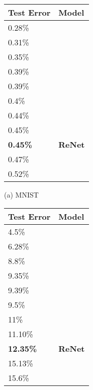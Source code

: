 \documentclass{article} \usepackage{nips15submit_e,times}
\begin{document}
\begin{table}[ht]
    \centering

    \begin{minipage}{0.45\textwidth}
        \centering

        \begin{tabular}{l |  l}
            Test Error & Model  \\
            \hline
0.28\% & \citep{DBLP:conf/icml/WanZZLF13} \\
0.31\% & \citep{DBLP:journals/corr/Graham14} \\ 
0.35\% & \citep{DBLP:journals/corr/abs-1003-0358} \\
0.39\% & \citep{DBLP:conf/nips/MairalKHS14} \\
0.39\% & \citep{DBLP:journals/corr/LeeXGZT14} \\
0.4\% & \citep{DBLP:conf/icdar/SimardSP03} \\
0.44\% & \citep{DBLP:journals/corr/Graham14a} \\
0.45\% & \citep{Goodfellow2013} \\
\bf{0.45\%} & \bf{ReNet} \\ 
0.47\% & \citep{Lin2014} \\
0.52\% & \citep{DBLP:journals/pami/AzzopardiA13} \\
        \end{tabular}

        \vspace{2mm}
        (a) MNIST
    \end{minipage}
    \hfill
    \begin{minipage}{0.45\textwidth}
        \centering 

        \begin{tabular}{l |  l}
            Test Error & Model  \\
            \hline
4.5\% & \citep{DBLP:journals/corr/Graham14a} \\
6.28\% & \citep{DBLP:journals/corr/Graham14} \\ 
8.8\% & \citep{Lin2014} \\
9.35\% & \citep{Goodfellow2013} \\
9.39\% & \citep{DBLP:journals/corr/SpringenbergR13} \\
9.5\% & \citep{DBLP:conf/nips/SnoekLA12} \\
11\% & \citep{Krizhevsky-2012} \\
11.10\% & \citep{DBLP:conf/icml/WanZZLF13} \\
\bf{12.35\%} & \bf{ReNet} \\
15.13\% & \citep{DBLP:journals/corr/abs-1301-3557} \\
15.6\% & \citep{DBLP:journals/corr/abs-1207-0580} \\
        \end{tabular}


\end{minipage}
\end{table}
\end{document}
